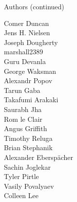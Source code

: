 \begin{frame}{Authors (continued)}
\begin{multicols}{5}
Comer Duncan\\
Jens H. Nielsen\\
Joseph Dougherty\\
marshall2389\\
Guru Devanla\\
George Waksman\\
Alexandr Popov\\
Tarun Gaba\\
Takafumi Arakaki\\
Saurabh Jha\\
Rom le Clair\\
Angus Griffith\\
Timothy Reluga\\
Brian Stephanik\\
Alexander Eberspächer\\
Sachin Joglekar\\
Tyler Pirtle\\
Vasily Povalyaev\\
Colleen Lee\\
\end{multicols}
\end{frame}
